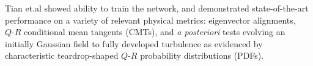Tian et.al \cite{tian2021} showed ability to train the network, and demonstrated state-of-the-art performance on a variety of relevant physical metrics: eigenvector alignments, $Q\text{-}R$ conditional mean tangents (CMTs), and \textit{a posteriori} tests evolving an initially Gaussian field to fully developed turbulence as evidenced by characteristic teardrop-shaped $Q\text{-}R$ probability distributions (PDFs).


